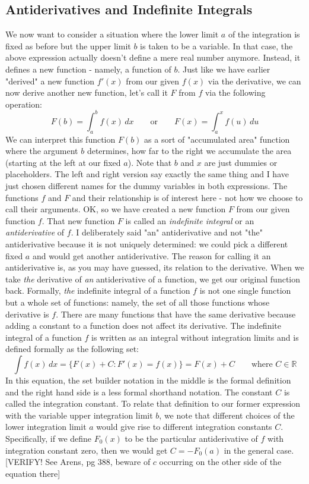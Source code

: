 \subsection{Antiderivatives and Indefinite Integrals}
We now want to consider a situation where the lower limit $a$ of the integration is fixed as before but the upper limit $b$ is taken to be a variable. In that case, the above expression actually doesn't define a mere real number anymore. Instead, it defines a new function - namely, a function of $b$. Just like we have earlier "derived" a new function $f'(x)$ from our given $f(x)$ via the derivative, we can now derive another new function, let's call it $F$ from $f$ via the following operation:
\begin{equation}
F(b) = \int_a^b f(x) \, dx \qquad \text{or} \qquad
F(x) = \int_a^x f(u) \, du
\end{equation}
We can interpret this function $F(b)$ as a sort of "accumulated area" function where the argument $b$ determines, how far to the right we accumulate the area (starting at the left at our fixed $a$). Note that $b$ and $x$ are just dummies or placeholders. The left and right version say exactly the same thing and I have just chosen different names for the dummy variables in both expressions. The functions $f$ and $F$ and their relationship is of interest here - not how we choose to call their arguments. OK, so we have created a new function $F$ from our given function $f$. That new function $F$ is called an \emph{indefinite integral} or an \emph{antiderivative} of $f$. I deliberately said "an" antiderivative and not "the" antiderivative because it is not uniquely determined: we could pick a different fixed $a$ and would get another antiderivative. 
The reason for calling it an antiderivative is, as you may have guessed, its relation to the derivative. When we take \emph{the} derivative of \emph{an} antiderivative of a function, we get our original function back. Formally, \emph{the} indefinite integral of a function $f$ is not one single function but a whole set of functions: namely, the set of all those functions whose derivative is $f$. There are many functions that have the same derivative because adding a constant to a function does not affect its derivative. The indefinite integral of a function $f$ is written as an integral without integration limits and is defined formally as the following set:
\begin{equation}
 \int f(x) \, dx = 	\{ F(x) + C : F'(x) = f(x) \} = F(x) + C \qquad \text{where } C \in \mathbb{R}
\end{equation}
In this equation, the set builder notation in the middle is the formal definition and the right hand side is a less formal shorthand notation. The constant $C$ is called the integration constant. To relate that definition to our former expression with the variable upper integration limit $b$, we note that different choices of the lower integration limit $a$ would give rise to different integration constants $C$. Specifically, if we define $F_0(x)$ to be the particular antiderivative of $f$ with integration constant zero, then we would get $C = -F_0(a)$ in the general case. [VERIFY! See Arens, pg 388, beware of $c$ occurring on the other side of the equation there]


